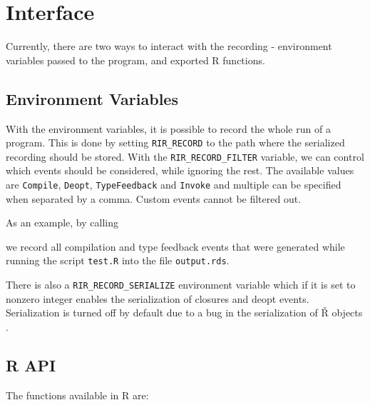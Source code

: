 \section{Interface}

Currently, there are two ways to interact with the recording - environment variables passed to the program, and exported R functions.

\subsection*{Environment Variables}

With the environment variables, it is possible to record the whole run of a program. This is done by setting \texttt{RIR\_RECORD} to the path where the serialized recording should be stored. With the \texttt{RIR\_RECORD\_FILTER} variable, we can control which events should be considered, while ignoring the rest. The available values are \texttt{Compile}, \texttt{Deopt}, \texttt{TypeFeedback} and \texttt{Invoke} and multiple can be specified when separated by a comma. Custom events cannot be filtered out.

As an example, by calling


\noindent we record all compilation and type feedback events that were generated while running the script \texttt{test.R} into the file \texttt{output.rds}.

There is also a \texttt{RIR\_RECORD\_SERIALIZE} environment variable which if it is set to nonzero integer enables the serialization of closures and deopt events. Serialization is turned off by default due to a bug in the serialization of Ř objects .

\subsection*{R API}

The functions available in R are: 

